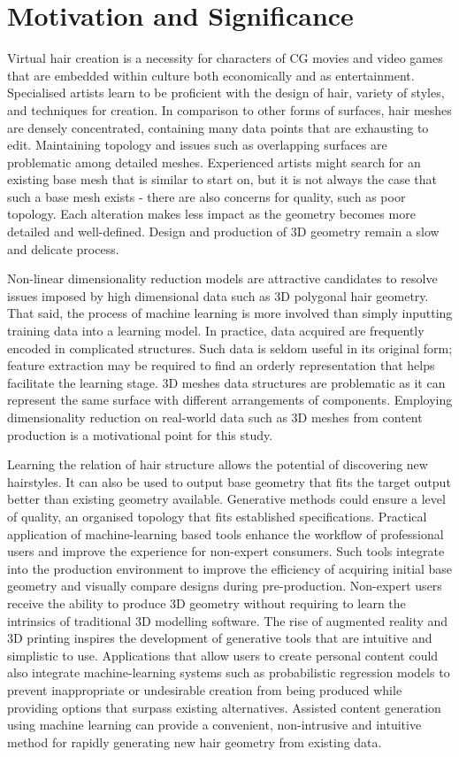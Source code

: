 \documentclass[ %
author={Dillon Keith Diep},
supervisor={Dr. Carl Henrik Ek},
degree={MEng},
title={ART-CG Hair:},
subtitle={Assisted Real-time Content Generation of Stylised Virtual Hair},
type={Research},
year={2017} ]{dissertation}
\begin{document}
\section{Motivation and Significance}
Virtual hair creation is a necessity for characters of CG movies and video games that are embedded within culture both economically and as entertainment. Specialised artists learn to be proficient with the design of hair, variety of styles, and techniques for creation. In comparison to other forms of surfaces, hair meshes are densely concentrated, containing many data points that are exhausting to edit. Maintaining topology and issues such as overlapping surfaces are problematic among detailed meshes. Experienced artists might search for an existing base mesh that is similar to start on, but it is not always the case that such a base mesh exists - there are also concerns for quality, such as poor topology. Each alteration makes less impact as the geometry becomes more detailed and well-defined. Design and production of 3D geometry remain a slow and delicate process.

Non-linear dimensionality reduction models are attractive candidates to resolve issues imposed by high dimensional data such as 3D polygonal hair geometry. That said, the process of machine learning is more involved than simply inputting training data into a learning model. In practice, data acquired are frequently encoded in complicated structures. Such data is seldom useful in its original form; feature extraction may be required to find an orderly representation that helps facilitate the learning stage. 3D meshes data structures are problematic as it can represent the same surface with different arrangements of components. Employing dimensionality reduction on real-world data such as 3D meshes from content production is a motivational point for this study.

Learning the relation of hair structure allows the potential of discovering new hairstyles.  It can also be used to output base geometry that fits the target output better than existing geometry available. Generative methods could ensure a level of quality, an organised topology that fits established specifications. Practical application of machine-learning based tools enhance the workflow of professional users and improve the experience for non-expert consumers. Such tools integrate into the production environment to improve the efficiency of acquiring initial base geometry and visually compare designs during pre-production. Non-expert users receive the ability to produce 3D geometry without requiring to learn the intrinsics of traditional 3D modelling software. The rise of augmented reality and 3D printing inspires the development of generative tools that are intuitive and simplistic to use. Applications that allow users to create personal content could also integrate machine-learning systems such as probabilistic regression models to prevent inappropriate or undesirable creation from being produced while providing options that surpass existing alternatives. Assisted content generation using machine learning can provide a convenient, non-intrusive and intuitive method for rapidly generating new hair geometry from existing data.
\end{document}
